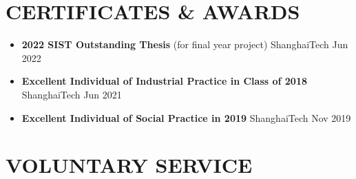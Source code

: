 \documentclass[a4paper,10pt]{ctexart} %
\begin{document}
\newpage



\section{CERTIFICATES \& AWARDS}

    \begin{itemize}
        \item \textbf{2022 SIST Outstanding Thesis} {\small (for final year project)} \hfill ShanghaiTech \quad Jun 2022
        \item \textbf{Excellent Individual of Industrial Practice in Class of 2018} \hfill ShanghaiTech \quad Jun 2021
        \item \textbf{Excellent Individual of Social Practice in 2019} \hfill ShanghaiTech \quad Nov 2019
    \end{itemize}



\section{VOLUNTARY SERVICE}
\end{document}
